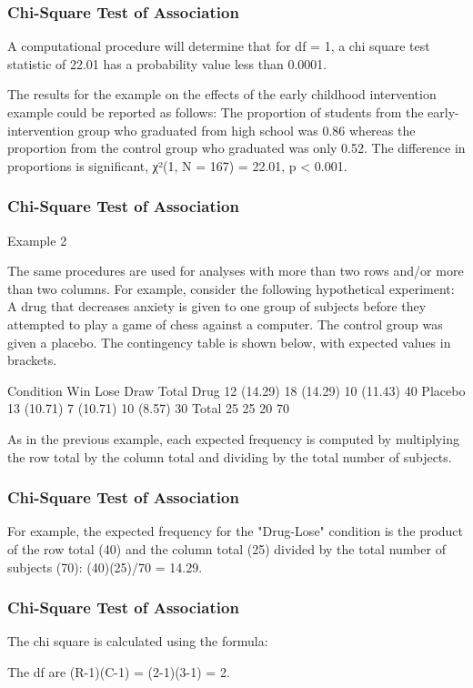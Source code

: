 \begin{frame}
\frametitle{Chi-Square Test of Association}

\Large
A computational procedure will determine that for df = 1, a chi square test statistic of 22.01 has a probability value less than 0.0001.
 
 
The results for the example on the effects of the early childhood intervention example could be reported as follows:
The proportion of students from the early-intervention group who graduated from high school was 0.86 whereas the proportion from the control group who graduated was only 0.52. The difference in proportions is significant, χ²(1, N = 167) = 22.01, p < 0.001.
 
 \end{frame}

\begin{frame}
\frametitle{Chi-Square Test of Association}

\Large
Example 2 
 
The same procedures are used for analyses with more than two rows and/or more than two columns. For example, consider the following hypothetical experiment: A drug that decreases anxiety is given to one group of subjects before they attempted to play a game of chess against a computer. The control group was given a placebo. The contingency table is shown below, with expected values in brackets.
 
Condition
Win
Lose
Draw
Total
Drug
12
(14.29)
18
(14.29)
10
(11.43)
40
Placebo
13
(10.71)
7
(10.71)
10
(8.57)
30
Total
25
25
20
70
 
As in the previous example, each expected frequency is computed by multiplying the row total by the column total and dividing by the total number of subjects.
 \end{frame}

\begin{frame}
\frametitle{Chi-Square Test of Association}

\Large
For example, the expected frequency for the "Drug-Lose" condition is the product of the row total (40) and the column total (25) divided by the total number of subjects (70): (40)(25)/70 = 14.29. 
 
 \end{frame}

\begin{frame}
\frametitle{Chi-Square Test of Association}

\Large
The chi square is calculated using the formula:
 
 
 
 
 
The df are (R-1)(C-1) = (2-1)(3-1) = 2.

 \end{frame}

